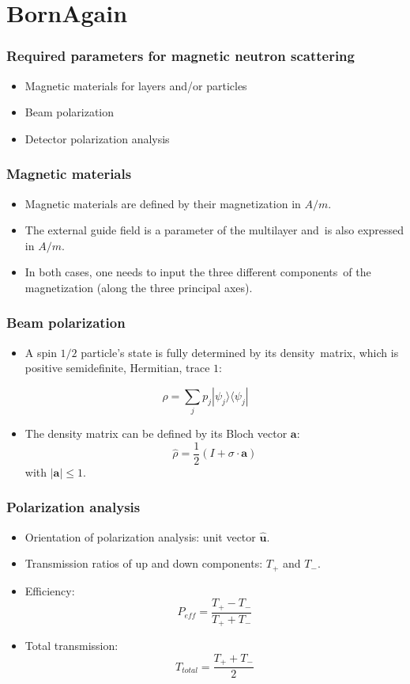 \documentclass{beamer}
\begin{document}
\section{BornAgain}

\begin{frame}
    \frametitle{Required parameters for magnetic neutron scattering}
    \begin{itemize}
        \item Magnetic materials for layers and/or particles
        \item Beam polarization
        \item Detector polarization analysis
    \end{itemize}
\end{frame}

\begin{frame}
    \frametitle{Magnetic materials}
    \begin{itemize}
        \item Magnetic materials are defined by their magnetization in $A/m$.
        \item The external guide field is a parameter of the multilayer and\
              is also expressed in $A/m$.
        \item In both cases, one needs to input the three different components\
              of the magnetization (along the three principal axes).
    \end{itemize}
\end{frame}

\begin{frame}
    \frametitle{Beam polarization}
    \begin{itemize}
        \item A spin $1/2$ particle's state is fully determined by its density\
              matrix, which is positive semidefinite, Hermitian, trace $1$:
    \end{itemize}
    \[ \hat\rho = \sum_j p_j \left| \psi_j \rangle\langle \psi_j \right| \]
    \begin{itemize}
        \item The density matrix can be defined by its Bloch vector $\mathbf a$:
        \[ \hat\rho = \frac{1}{2}\left( I + \sigma\cdot\mathbf a \right) \]
              with $|\mathbf a| \leq 1$.
    \end{itemize}
    
\end{frame}

\begin{frame}
    \frametitle{Polarization analysis}
    \begin{itemize}
        \item Orientation of polarization analysis: unit vector $\mathbf{\hat u}$.
        \item Transmission ratios of up and down components: $T_+$ and $T_-$.
        \item Efficiency:
              \[ P_{eff} = \frac{T_+ - T_-}{T_+ + T_-} \]
        \item Total transmission:
              \[ T_{total} = \frac{T_+ + T_-}{2} \]
    \end{itemize}
\end{frame}
\end{document}
